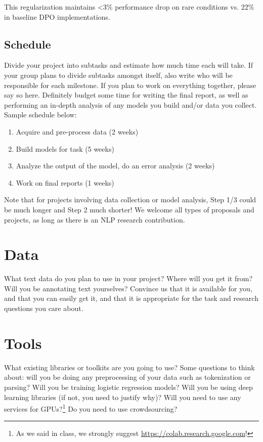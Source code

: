 \documentclass[11pt,a4paper]{article}
\begin{document}
This regularization maintains <3\% performance drop on rare conditions vs. 22\% in baseline DPO implementations.

\subsection{Schedule}
Divide your project into subtasks and estimate how much time each will take. If your group plans to divide subtasks amongst itself, also write who will be responsible for each milestone. If you plan to work on everything together, please say so here. Definitely budget some time for writing the final report, as well as performing an in-depth analysis of any models you build and/or data you collect. Sample schedule below:
\begin{enumerate}
    \item Acquire and pre-process data (2 weeks)
    \item Build models for task (5 weeks)
    \item Analyze the output of the model, do an error analysis (2 weeks)
    \item Work on final reports (1 weeks)
\end{enumerate}

Note that for projects involving data collection or model analysis, Step 1/3 could be much longer and Step 2 much shorter! We welcome all types of proposals and projects, as long as there is an NLP research contribution.

\section{Data}

What text data do you plan to use in your project? Where will you get it from? Will you be annotating text yourselves? Convince us that it is available for you, and that you can easily get it, and that it is appropriate for the task and research questions you care about.


\section{Tools}
What existing libraries or toolkits are you going to use? Some questions to think about: will you be doing any preprocessing of your data such as tokenization or parsing? Will you be training logistic regression models? Will you be using deep learning libraries (if not, you need to justify why)? Will you need to use any services for GPUs?\footnote{As we said in class, we strongly suggest \url{https://colab.research.google.com}!} Do you need to use crowdsourcing?


\footnotesize

\end{document}
